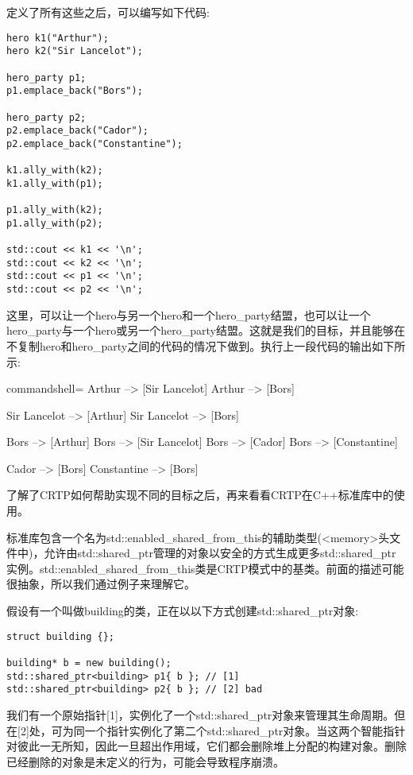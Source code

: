 定义了所有这些之后，可以编写如下代码:

\begin{lstlisting}[style=styleCXX]
hero k1("Arthur");
hero k2("Sir Lancelot");

hero_party p1;
p1.emplace_back("Bors");

hero_party p2;
p2.emplace_back("Cador");
p2.emplace_back("Constantine");

k1.ally_with(k2);
k1.ally_with(p1);

p1.ally_with(k2);
p1.ally_with(p2);

std::cout << k1 << '\n';
std::cout << k2 << '\n';
std::cout << p1 << '\n';
std::cout << p2 << '\n';
\end{lstlisting}

这里，可以让一个hero与另一个hero和一个hero\_party结盟，也可以让一个hero\_party与一个hero或另一个hero\_party结盟。这就是我们的目标，并且能够在不复制hero和hero\_party之间的代码的情况下做到。执行上一段代码的输出如下所示:

\begin{tcblisting}{commandshell={}}
Arthur --> [Sir Lancelot]
Arthur --> [Bors]

Sir Lancelot --> [Arthur]
Sir Lancelot --> [Bors]

Bors --> [Arthur]
Bors --> [Sir Lancelot]
Bors --> [Cador]
Bors --> [Constantine]

Cador --> [Bors]
Constantine --> [Bors]
\end{tcblisting}

了解了CRTP如何帮助实现不同的目标之后，再来看看CRTP在C++标准库中的使用。


标准库包含一个名为std::enabled\_shared\_from\_this的辅助类型(<memory>头文件中)，允许由std::shared\_ptr管理的对象以安全的方式生成更多std::shared\_ptr实例。std::enabled\_shared\_from\_this类是CRTP模式中的基类。前面的描述可能很抽象，所以我们通过例子来理解它。

假设有一个叫做building的类，正在以以下方式创建std::shared\_ptr对象:

\begin{lstlisting}[style=styleCXX]
struct building {};

building* b = new building();
std::shared_ptr<building> p1{ b }; // [1]
std::shared_ptr<building> p2{ b }; // [2] bad
\end{lstlisting}

我们有一个原始指针[1]，实例化了一个std::shared\_ptr对象来管理其生命周期。但在[2]处，可为同一个指针实例化了第二个std::shared\_ptr对象。当这两个智能指针对彼此一无所知，因此一旦超出作用域，它们都会删除堆上分配的构建对象。删除已经删除的对象是未定义的行为，可能会导致程序崩溃。

